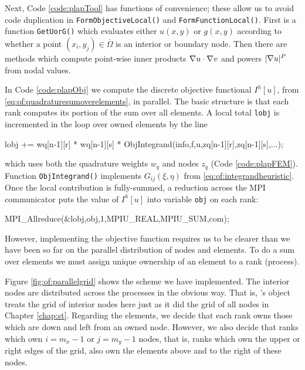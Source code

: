 Next, Code \ref{code:plapTool} has functions of convenience; these allow us to avoid code duplication in \texttt{FormObjectiveLocal()} and \texttt{FormFunctionLocal()}.  First is a function \texttt{GetUorG()} which evaluates either $u(x,y)$ or $g(x,y)$ according to whether a point $(x_i,y_j)\in\overline\Omega$ is an interior or boundary node.  Then there are methods which compute point-wise inner products $\nabla u\cdot \nabla v$ and powers $|\nabla u|^P$ from nodal values.


In Code \ref{code:plapObj} we compute the discrete objective functional $I^h[u]$, from \eqref{eq:of:quadraturesumoverelements}, in parallel.  The basic structure is that each rank computes its portion of the sum over all elements.  A local total \texttt{lobj} is incremented in the loop over owned elements by the line
\begin{code}
    lobj += wq[n-1][r] * wq[n-1][s] * ObjIntegrand(info,f,u,zq[n-1][r],zq[n-1][s],...);
\end{code}
which uses both the quadrature weights $w_q$ and nodes $z_q$ (Code \ref{code:plapFEM}).  Function \texttt{ObjIntegrand()} implements $G_{ij}(\xi,\eta)$ from \eqref{eq:of:integrandheuristic}.  Once the local contribution is fully-summed, a reduction across the MPI communicator puts the value of $I^h[u]$ into variable \texttt{obj} on each rank:
\begin{code}
    MPI_Allreduce(&lobj,obj,1,MPIU_REAL,MPIU_SUM,com);
\end{code}

However, implementing the objective function requires us to be clearer than we have been so far on the parallel distribution of nodes and elements.  To do a sum over elements we must assign unique ownership of an element to a rank (process).


Figure \ref{fig:of:parallelgrid} shows the scheme we have implemented.  The interior nodes are distributed across the processes in the obvious way.  That is, \PETSc's \pDMDA object treats the grid of interior nodes here just as it did the grid of all nodes in Chapter \ref{chap:st}.  Regarding the elements, we decide that each rank owns those which are down and left from an owned node.  However, we also decide that ranks which own $i=m_x-1$ or $j=m_y-1$ nodes, that is, ranks which own the upper or right edges of the grid, also own the elements above and to the right of these nodes.

